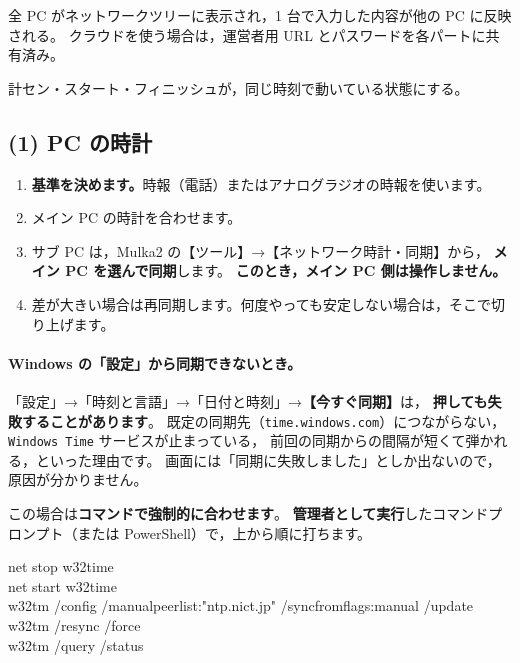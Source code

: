 \begin{Done}
全 PC がネットワークツリーに表示され，1 台で入力した内容が他の PC に反映される。
クラウドを使う場合は，運営者用 URL とパスワードを各パートに共有済み。
\end{Done}


\begin{Goal}
計セン・スタート・フィニッシュが，同じ時刻で動いている状態にする。
\end{Goal}

\subsection*{(1) PC の時計}

\begin{enumerate}
\item \textbf{基準を決めます。}時報（電話）またはアナログラジオの時報を使います。
\item メイン PC の時計を合わせます。
\item サブ PC は，Mulka2 の【ツール】→【ネットワーク時計・同期】から，
      \textbf{メイン PC を選んで同期}します。\ver
      \textbf{このとき，メイン PC 側は操作しません。}
\item 差が大きい場合は再同期します。何度やっても安定しない場合は，そこで切り上げます。
\end{enumerate}


\paragraph{Windows の「設定」から同期できないとき。}
「設定」→「時刻と言語」→「日付と時刻」→\textbf{【今すぐ同期】}は，
\textbf{押しても失敗することがあります}。
既定の同期先（\texttt{time.windows.com}）につながらない，
\texttt{Windows Time} サービスが止まっている，
前回の同期からの間隔が短くて弾かれる，といった理由です。
画面には「同期に失敗しました」としか出ないので，原因が分かりません。

この場合は\textbf{コマンドで強制的に合わせます}。
\textbf{管理者として実行}したコマンドプロンプト（または PowerShell）で，上から順に打ちます。

\begin{center}
\begin{tcolorbox}[colback=white,colframe=rulec,boxrule=0.4pt,arc=1pt,width=0.95\textwidth]
\ttfamily\footnotesize
net stop w32time\\
net start w32time\\
w32tm /config /manualpeerlist:"ntp.nict.jp" /syncfromflags:manual /update\\
w32tm /resync /force\\
w32tm /query /status
\end{tcolorbox}
\end{center}

